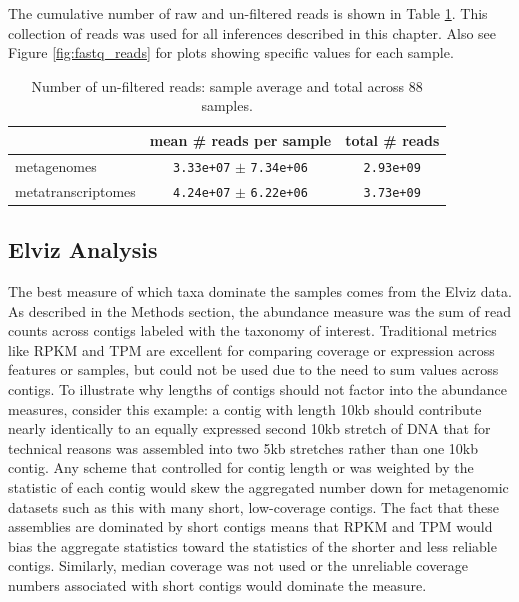 The cumulative number of raw and un-filtered reads is shown in Table \ref{table:sample_read_sizes}.
This collection of reads was used for all inferences described in this chapter.
Also see Figure \ref{fig:fastq_reads} for plots showing specific values for each sample.

\begin{table}[H]
\centering
\begin{singlespace}
\caption[Number of un-filtered reads: sample average and total]
	{Number of un-filtered reads: sample average and total across 88 samples.
	}
\begin{tabular}{l | cc}
        & mean \# reads per sample & total \# reads \\
\midrule
	metagenomes & \texttt{3.33e+07} $\pm$ \texttt{7.34e+06} & \texttt{2.93e+09} \\ %
	metatranscriptomes & \texttt{4.24e+07} $\pm$ \texttt{6.22e+06} &  \texttt{3.73e+09} \\
\end{tabular}
\label{table:sample_read_sizes}
\end{singlespace}
\end{table}



\subsection{Elviz Analysis}    %
\label{results:elviz}

The best measure of which taxa dominate the samples comes from the Elviz \cite{cantor2015} data.
As described in the Methods section, the abundance measure was the sum of read counts across contigs labeled with the taxonomy of interest.
Traditional metrics like RPKM \cite{mortazavi2008} and TPM \cite{wagner2012} are excellent for comparing coverage or expression across features or samples, but could not be used due to the need to sum values across contigs.
To illustrate why lengths of contigs should not factor into the abundance measures, consider this example:
a contig with length 10kb should contribute nearly identically to an equally expressed second 10kb stretch of DNA that for technical reasons was assembled into two 5kb stretches rather than one 10kb contig.
Any scheme that controlled for contig length or was weighted by the statistic of each contig would skew the aggregated number down for metagenomic datasets such as this with many short, low-coverage contigs.
The fact that these assemblies are dominated by short contigs means that RPKM and TPM would bias the aggregate statistics toward the statistics of the shorter and less reliable contigs.
Similarly, median coverage was not used or the unreliable coverage numbers associated with short contigs would dominate the measure.

